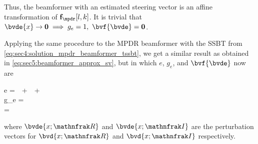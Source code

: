 Thus, the beamformer with an estimated steering vector is an affine transformation of $\bvfb{\mpdr}[l,k]$. It is trivial that $\bvde{x} \to \mathbf{0} \implies g_e = 1,~\bvf{\bvde} = \mathbf{0}$.

Applying the same procedure to the MPDR beamformer with the SSBT from \cref{eq:sec4:solution_mpdr_beamformer_tssbt}, we get a similar result as obtained in \cref{eq:sec5:beamformer_approx_sv}, but in which $e$, $g_e$, and $\bvf{\bvde}$ now are
\begin{subgather}
	e =  \,\bvOm\,  +  \,\bvOm\,  +  \,\bvOm\,  \\
	g_e =  \\
	\bvf{\bvde} = 
\end{subgather}
where $\bvde{x;\re}$ and $\bvde{x;\im}$ are the perturbation vectors for $\bvd{x;\re}$ and $\bvd{x;\im}$ respectively.

%
%

